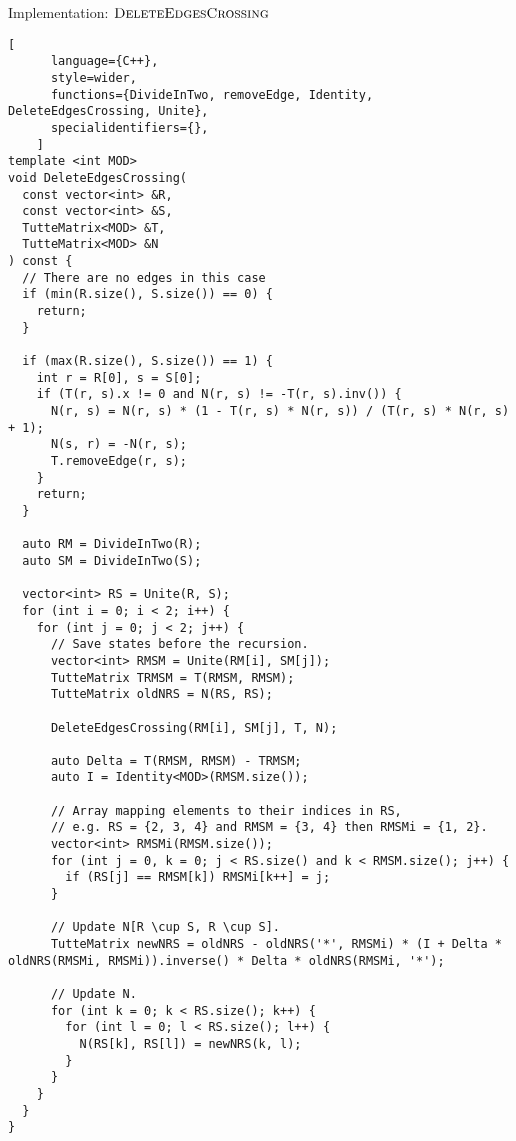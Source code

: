 \begin{programruledcaption}{Implementation: \(\textsc{DeleteEdgesCrossing}\)}
    \begin{lstlisting}[
      language={C++},
      style=wider,
      functions={DivideInTwo, removeEdge, Identity, DeleteEdgesCrossing, Unite},
      specialidentifiers={},
    ]
template <int MOD>
void DeleteEdgesCrossing(
  const vector<int> &R, 
  const vector<int> &S,
  TutteMatrix<MOD> &T,
  TutteMatrix<MOD> &N
) const {
  // There are no edges in this case
  if (min(R.size(), S.size()) == 0) {
    return;
  }

  if (max(R.size(), S.size()) == 1) {
    int r = R[0], s = S[0];
    if (T(r, s).x != 0 and N(r, s) != -T(r, s).inv()) {
      N(r, s) = N(r, s) * (1 - T(r, s) * N(r, s)) / (T(r, s) * N(r, s) + 1);
      N(s, r) = -N(r, s);
      T.removeEdge(r, s);
    }
    return;
  } 

  auto RM = DivideInTwo(R);
  auto SM = DivideInTwo(S);

  vector<int> RS = Unite(R, S);
  for (int i = 0; i < 2; i++) {
    for (int j = 0; j < 2; j++) {
      // Save states before the recursion.
      vector<int> RMSM = Unite(RM[i], SM[j]);
      TutteMatrix TRMSM = T(RMSM, RMSM);
      TutteMatrix oldNRS = N(RS, RS);

      DeleteEdgesCrossing(RM[i], SM[j], T, N);

      auto Delta = T(RMSM, RMSM) - TRMSM;
      auto I = Identity<MOD>(RMSM.size());

      // Array mapping elements to their indices in RS,
      // e.g. RS = {2, 3, 4} and RMSM = {3, 4} then RMSMi = {1, 2}.
      vector<int> RMSMi(RMSM.size());
      for (int j = 0, k = 0; j < RS.size() and k < RMSM.size(); j++) {
        if (RS[j] == RMSM[k]) RMSMi[k++] = j;
      }

      // Update N[R \cup S, R \cup S].
      TutteMatrix newNRS = oldNRS - oldNRS('*', RMSMi) * (I + Delta * oldNRS(RMSMi, RMSMi)).inverse() * Delta * oldNRS(RMSMi, '*');

      // Update N.
      for (int k = 0; k < RS.size(); k++) {
        for (int l = 0; l < RS.size(); l++) {
          N(RS[k], RS[l]) = newNRS(k, l);
        }
      }
    }
  }
}
    \end{lstlisting}
\end{programruledcaption}


